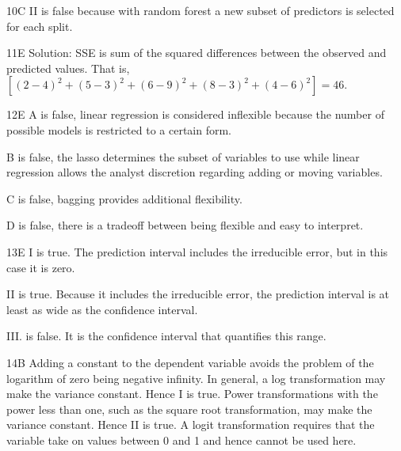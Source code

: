 \begin{solution}{10}{C}
II is false because with random forest a new subset of predictors is selected for each split.
\end{solution}

\begin{solution}{11}{E}
Solution: SSE is sum of the squared differences between the observed and predicted values. That is, $[(2-4)^2 + (5-3)^2 + (6-9)^2 + (8-3)^2 + (4-6)^2] = 46.$
\end{solution}

\begin{solution}{12}{E}
A is false, linear regression is considered inflexible because the number of possible models is restricted to a certain form.

B is false, the lasso determines the subset of variables to use while linear regression allows the analyst discretion regarding adding or moving variables.

C is false, bagging provides additional flexibility.

D is false, there is a tradeoff between being flexible and easy to interpret.
\end{solution}

\begin{solution}{13}{E}
I is true. The prediction interval includes the irreducible error, but in this case it is zero.

II is true. Because it includes the irreducible error, the prediction interval is at least as wide as the confidence interval.

III. is false. It is the confidence interval that quantifies this range.
\end{solution}

\begin{solution}{14}{B}
Adding a constant to the dependent variable avoids the problem of the logarithm of zero being negative infinity. In general, a log transformation may make the variance constant. Hence I is true. Power transformations with the power less than one, such as the square root transformation, may make the variance constant. Hence II is true. A logit transformation requires that the variable take on values between 0 and 1 and hence cannot be used here.
\end{solution}

